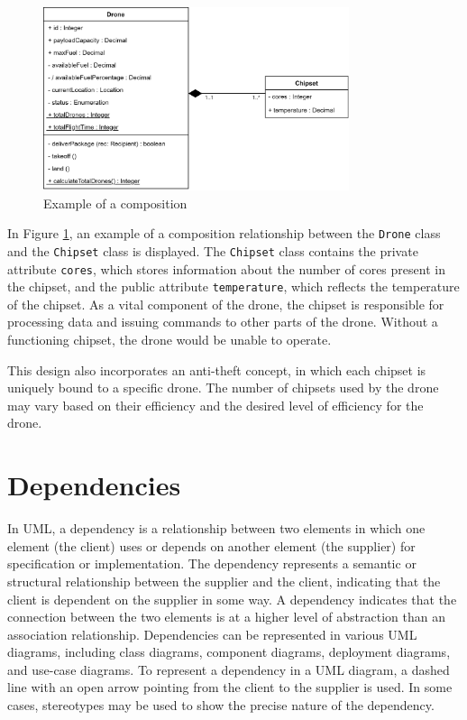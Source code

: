 \documentclass[
	12pt,
    a4paper,
    egregdoesnotlikesansseriftitles, %
    toc=chapterentrywithdots,
    oneside, openany,
    titlepage,
    parskip=half,
    headings=normal,  %
    listof=totoc,
    bibliography=totocnumbered,
    index=totoc,
    captions=tableheading,  %
    listof=flat,
    numbers=noenddot, %
    final]
    {scrbook}
\begin{document}
\begin{figure}[h]
\centering
\includegraphics[width=0.8\textwidth]{figures/aggr_comp/comp.jpg}
\caption[Example composition]{Example of a composition}
\label{fig:composition_example}
\end{figure}


In Figure \ref{fig:composition_example}, an example of a composition relationship between the \texttt{Drone} class and the \texttt{Chipset} class is displayed. The \texttt{Chipset} class contains the private attribute \texttt{cores}, which stores information about the number of cores present in the chipset, and the public attribute \texttt{temperature}, which reflects the temperature of the chipset. As a vital component of the drone, the chipset is responsible for processing data and issuing commands to other parts of the drone. Without a functioning chipset, the drone would be unable to operate.

This design also incorporates an anti-theft concept, in which each chipset is uniquely bound to a specific drone. The number of chipsets used by the drone may vary based on their efficiency and the desired level of efficiency for the drone.


\chapter{Dependencies}

In UML, a dependency is a relationship between two elements in which one element (the client) uses or depends on another element (the supplier) for specification or implementation.
The dependency represents a semantic or structural relationship between the supplier and the client, indicating that the client is dependent on the supplier in some way.
A dependency indicates that the connection between the two elements is at a higher level of abstraction than an association relationship.
Dependencies can be represented in various UML diagrams, including class diagrams, component diagrams, deployment diagrams, and use-case diagrams. 
To represent a dependency in a UML diagram, a dashed line with an open arrow pointing from the client to the supplier is used. 
In some cases, stereotypes may be used to show the precise nature of the dependency. \cite[p. 159-160]{uml}
\end{document}
